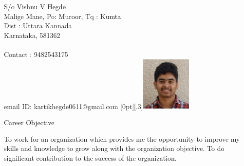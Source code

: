 \documentclass{resume} %
\begin{document}
\begin{rSection}{}

 S/o Vishnu V Hegde 
 \\Malige Mane, Po: Muroor, Tq : Kumta  
 \\Dist : Uttara Kannada 
 \\Karnataka, 581362\\
 \\Contact : 9482543175
 \\email ID: kartikhegde0611@gmail.com\hfill 
 \raisebox{-.1\totalheight}[0pt][.3\totalheight]{\includegraphics[width=2.5cm,height=2.7cm]{kartik.png}}

\end{rSection}


\vspace{1cm}


\begin{rSection}{Career Objective}

 To work for an organization which provides me the opportunity to improve my skills and knowledge to grow along with the organization objective. To do significant contribution to the success of the organization.
 
\end{rSection}


\vspace{1cm}


\end{document}
